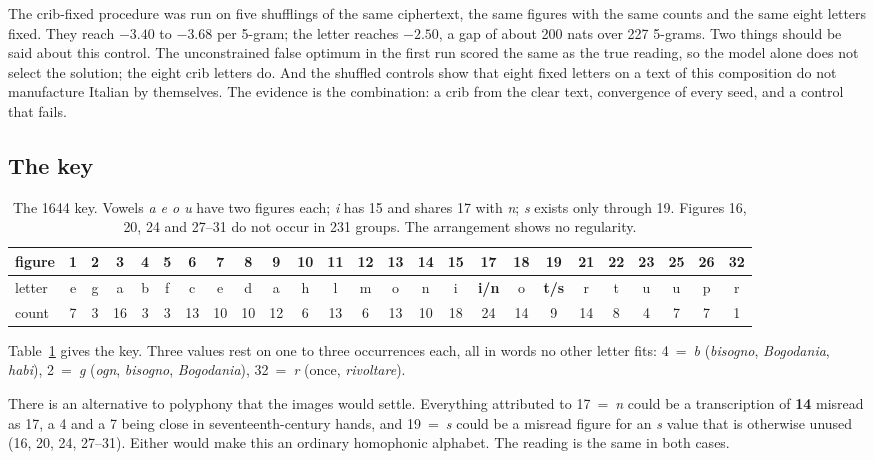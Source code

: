 \documentclass[11pt]{article}
\begin{document}
The crib-fixed procedure was run on five shufflings of the same ciphertext, the same figures with the same counts and the same eight letters fixed. They reach $-3.40$ to $-3.68$ per 5-gram; the letter reaches $-2.50$, a gap of about 200 nats over 227 5-grams. Two things should be said about this control. The unconstrained false optimum in the first run scored the same as the true reading, so the model alone does not select the solution; the eight crib letters do. And the shuffled controls show that eight fixed letters on a text of this composition do not manufacture Italian by themselves. The evidence is the combination: a crib from the clear text, convergence of every seed, and a control that fails.

\subsection{The key}

\begin{table}[t]
\centering\small
\begin{tabular}{@{}l*{24}{c}@{}}
\toprule
figure & 1 & 2 & 3 & 4 & 5 & 6 & 7 & 8 & 9 & 10 & 11 & 12 & 13 & 14 & 15 & 17 & 18 & 19 & 21 & 22 & 23 & 25 & 26 & 32 \\
\midrule
letter & e & g & a & b & f & c & e & d & a & h & l & m & o & n & i & \textbf{i/n} & o & \textbf{t/s} & r & t & u & u & p & r \\
count & 7 & 3 & 16 & 3 & 3 & 13 & 10 & 10 & 12 & 6 & 13 & 6 & 13 & 10 & 18 & 24 & 14 & 9 & 14 & 8 & 4 & 7 & 7 & 1 \\
\bottomrule
\end{tabular}
\caption{\label{tab:luccakey} The 1644 key. Vowels \emph{a e o u} have two figures each; \emph{i} has 15 and shares 17 with \emph{n}; \emph{s} exists only through 19. Figures 16, 20, 24 and 27--31 do not occur in 231 groups. The arrangement shows no regularity.}
\end{table}

Table~\ref{tab:luccakey} gives the key. Three values rest on one to three occurrences each, all in words no other letter fits: 4~=~\emph{b} (\emph{bisogno}, \emph{Bogodania}, \emph{habi}), 2~=~\emph{g} (\emph{ogn}, \emph{bisogno}, \emph{Bogodania}), 32~=~\emph{r} (once, \emph{rivoltare}).

There is an alternative to polyphony that the images would settle. Everything attributed to 17~=~\emph{n} could be a transcription of \textbf{14} misread as 17, a 4 and a 7 being close in seventeenth-century hands, and 19~=~\emph{s} could be a misread figure for an \emph{s} value that is otherwise unused (16, 20, 24, 27--31). Either would make this an ordinary homophonic alphabet. The reading is the same in both cases.
\end{document}

